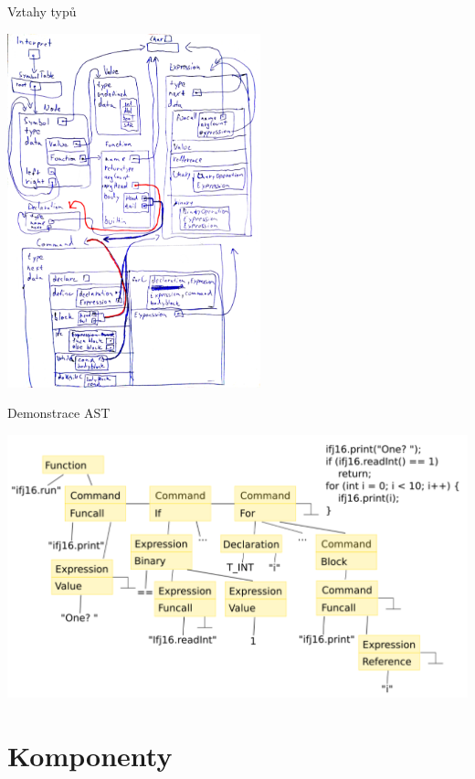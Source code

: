 \documentclass[13pt]{beamer}
\begin{document}
\begin{frame}{Vztahy typů}
  \begin{center}
    \includegraphics[width=0.55\textwidth]{./img/AST.pdf}
  \end{center}
\end{frame}

\begin{frame}{Demonstrace AST}
  \begin{center}
    \includegraphics[width=1\textwidth]{./img/ast2.pdf}
  \end{center}
\end{frame}

\section{Komponenty}
\end{document}
